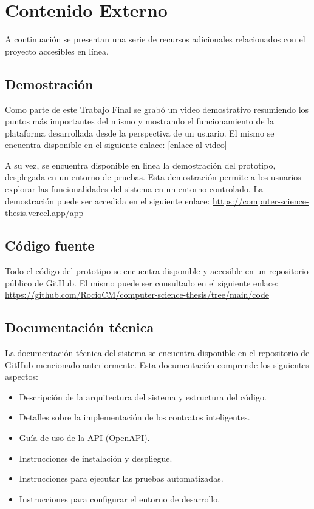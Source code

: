 \chapter{Contenido Externo}
\label{cp:annex-content}

\parindent0pt

A continuación se presentan una serie de recursos adicionales relacionados con el proyecto accesibles en línea.

\section{Demostración}
\label{sec:results-demo}

Como parte de este Trabajo Final se grabó un video demostrativo resumiendo los puntos más importantes del mismo y mostrando el funcionamiento de la plataforma desarrollada desde la perspectiva de un usuario. El mismo se encuentra disponible en el siguiente enlace: 
\href{enlace al video}{[enlace al video]} %

A su vez, se encuentra disponible en linea la demostración del prototipo, desplegada en un entorno de pruebas. Esta demostración permite a los usuarios explorar las funcionalidades del sistema en un entorno controlado. La demostración puede ser accedida en el siguiente enlace: \href{https://computer-science-thesis.vercel.app/app}{https://computer-science-thesis.vercel.app/app}

\section{Código fuente}
\label{sec:source-code}

Todo el código del prototipo se encuentra disponible y accesible en un repositorio público de GitHub. El mismo puede ser consultado en el siguiente enlace: \href{https://github.com/RocioCM/computer-science-thesis/tree/main/code}{https://github.com/RocioCM/computer-science-thesis/tree/main/code}

\section{Documentación técnica}
\label{sec:technical-docs}

La documentación técnica del sistema se encuentra disponible en el repositorio de GitHub mencionado anteriormente. Esta documentación comprende los siguientes aspectos:

\begin{itemize}
	\item Descripción de la arquitectura del sistema y estructura del código.
	\item Detalles sobre la implementación de los contratos inteligentes.
	\item Guía de uso de la API (OpenAPI).
	\item Instrucciones de instalación y despliegue.
	\item Instrucciones para ejecutar las pruebas automatizadas.
	\item Instrucciones para configurar el entorno de desarrollo.
\end{itemize}

